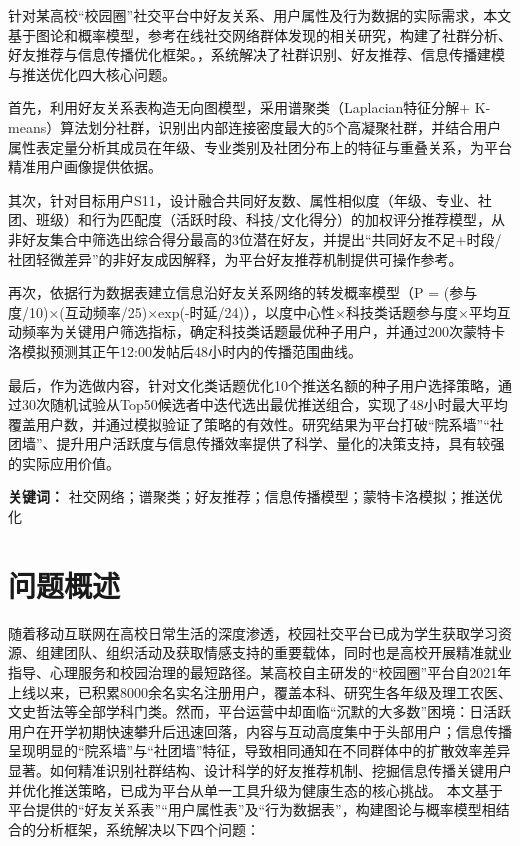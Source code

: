 \documentclass[a4paper,12pt]{ctexart}
\newenvironment{abstract_cumcm}{
    \begin{center}
        {\Large\bfseries 摘\quad 要}
    \end{center}
    \par\vspace{1ex}
}{}
\begin{document}
\begin{abstract_cumcm}
针对某高校“校园圈”社交平台中好友关系、用户属性及行为数据的实际需求，本文基于图论和概率模型，参考在线社交网络群体发现的相关研究\cite{ref1}，构建了社群分析、好友推荐与信息传播优化框架。，系统解决了社群识别、好友推荐、信息传播建模与推送优化四大核心问题。

首先，利用好友关系表构造无向图模型，采用谱聚类（Laplacian特征分解+ K-means）算法划分社群，识别出内部连接密度最大的5个高凝聚社群，并结合用户属性表定量分析其成员在年级、专业类别及社团分布上的特征与重叠关系，为平台精准用户画像提供依据。

其次，针对目标用户S11，设计融合共同好友数、属性相似度（年级、专业、社团、班级）和行为匹配度（活跃时段、科技/文化得分）的加权评分推荐模型，从非好友集合中筛选出综合得分最高的3位潜在好友，并提出“共同好友不足+时段/社团轻微差异”的非好友成因解释，为平台好友推荐机制提供可操作参考。

再次，依据行为数据表建立信息沿好友关系网络的转发概率模型（P = (参与度/10)×(互动频率/25)×exp(-时延/24)），以度中心性×科技类话题参与度×平均互动频率为关键用户筛选指标，确定科技类话题最优种子用户，并通过200次蒙特卡洛模拟预测其正午12:00发帖后48小时内的传播范围曲线。

最后，作为选做内容，针对文化类话题优化10个推送名额的种子用户选择策略，通过30次随机试验从Top50候选者中迭代选出最优推送组合，实现了48小时最大平均覆盖用户数，并通过模拟验证了策略的有效性。研究结果为平台打破“院系墙”“社团墙”、提升用户活跃度与信息传播效率提供了科学、量化的决策支持，具有较强的实际应用价值。

\vspace{2ex}
\noindent\textbf{关键词：} 社交网络；谱聚类；好友推荐；信息传播模型；蒙特卡洛模拟；推送优化
\end{abstract_cumcm}

\newpage

\tableofcontents
\newpage

\setcounter{page}{1}

\section{问题概述}
随着移动互联网在高校日常生活的深度渗透，校园社交平台已成为学生获取学习资源、组建团队、组织活动及获取情感支持的重要载体，同时也是高校开展精准就业指导、心理服务和校园治理的最短路径。某高校自主研发的“校园圈”平台自2021年上线以来，已积累8000余名实名注册用户，覆盖本科、研究生各年级及理工农医、文史哲法等全部学科门类。然而，平台运营中却面临“沉默的大多数”困境：日活跃用户在开学初期快速攀升后迅速回落，内容与互动高度集中于头部用户；信息传播呈现明显的“院系墙”与“社团墙”特征，导致相同通知在不同群体中的扩散效率差异显著。如何精准识别社群结构、设计科学的好友推荐机制、挖掘信息传播关键用户并优化推送策略，已成为平台从单一工具升级为健康生态的核心挑战。
本文基于平台提供的“好友关系表”“用户属性表”及“行为数据表”，构建图论与概率模型相结合的分析框架，系统解决以下四个问题：
\end{document}
